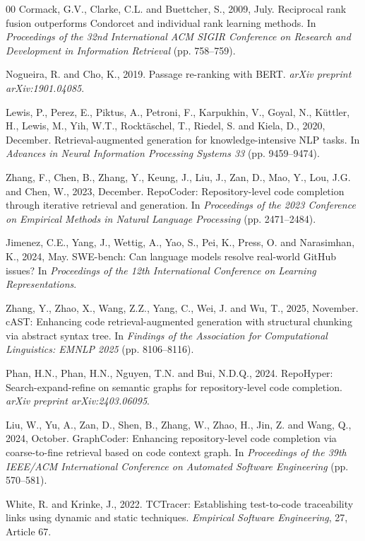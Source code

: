 \documentclass[conference]{IEEEtran}
\begin{document}
\begin{thebibliography}{00}
Cormack, G.V., Clarke, C.L. and Buettcher, S., 2009, July. Reciprocal rank
fusion outperforms Condorcet and individual rank learning methods. In
\textit{Proceedings of the 32nd International ACM SIGIR Conference on Research
and Development in Information Retrieval} (pp. 758--759).

Nogueira, R. and Cho, K., 2019. Passage re-ranking with BERT. \textit{arXiv
preprint arXiv:1901.04085}.

Lewis, P., Perez, E., Piktus, A., Petroni, F., Karpukhin, V., Goyal, N.,
K\"uttler, H., Lewis, M., Yih, W.T., Rockt\"aschel, T., Riedel, S. and
Kiela, D., 2020, December. Retrieval-augmented generation for
knowledge-intensive NLP tasks. In \textit{Advances in Neural Information
Processing Systems 33} (pp. 9459--9474).

Zhang, F., Chen, B., Zhang, Y., Keung, J., Liu, J., Zan, D., Mao, Y., Lou, J.G.
and Chen, W., 2023, December. RepoCoder: Repository-level code completion
through iterative retrieval and generation. In \textit{Proceedings of the 2023
Conference on Empirical Methods in Natural Language Processing}
(pp. 2471--2484).

Jimenez, C.E., Yang, J., Wettig, A., Yao, S., Pei, K., Press, O. and
Narasimhan, K., 2024, May. SWE-bench: Can language models resolve real-world
GitHub issues? In \textit{Proceedings of the 12th International Conference on
Learning Representations}.

Zhang, Y., Zhao, X., Wang, Z.Z., Yang, C., Wei, J. and Wu, T., 2025, November.
cAST: Enhancing code retrieval-augmented generation with structural chunking
via abstract syntax tree. In \textit{Findings of the Association for
Computational Linguistics: EMNLP 2025} (pp. 8106--8116).

Phan, H.N., Phan, H.N., Nguyen, T.N. and Bui, N.D.Q., 2024. RepoHyper:
Search-expand-refine on semantic graphs for repository-level code completion.
\textit{arXiv preprint arXiv:2403.06095}.

Liu, W., Yu, A., Zan, D., Shen, B., Zhang, W., Zhao, H., Jin, Z. and Wang, Q.,
2024, October. GraphCoder: Enhancing repository-level code completion via
coarse-to-fine retrieval based on code context graph. In \textit{Proceedings of
the 39th IEEE/ACM International Conference on Automated Software Engineering}
(pp. 570--581).

White, R. and Krinke, J., 2022. TCTracer: Establishing test-to-code
traceability links using dynamic and static techniques. \textit{Empirical
Software Engineering}, 27, Article 67.

\end{thebibliography}
\end{document}
